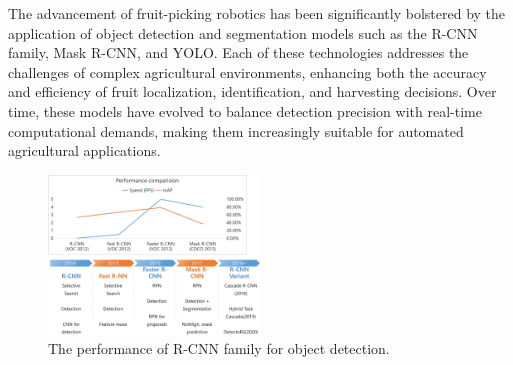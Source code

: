\documentclass[a4paper,fleqn]{cas-dc}
\begin{document}
The advancement of fruit-picking robotics has been significantly bolstered by the application of object detection and segmentation models such as the R-CNN family, Mask R-CNN, and YOLO. Each of these technologies addresses the challenges of complex agricultural environments, enhancing both the accuracy and efficiency of fruit localization, identification, and harvesting decisions. Over time, these models have evolved to balance detection precision with real-time computational demands, making them increasingly suitable for automated agricultural applications.
\begin{figure}[hbtp]
\centering
\includegraphics[width=0.5\textwidth]{fig_rcnn1.png}
\caption{The performance of R-CNN family for object detection.}
\label{fig:performance_rcnn}
\end{figure}
\end{document}
